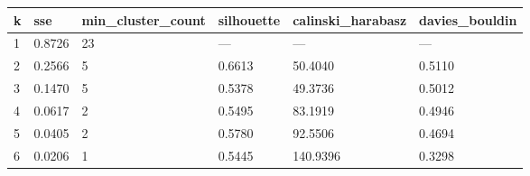 \begin{tabular}{llllll}
\hline
k & sse & min\_cluster\_count & silhouette & calinski\_harabasz & davies\_bouldin \\
\hline
1 & 0.8726 & 23 & — & — & — \\
2 & 0.2566 & 5 & 0.6613 & 50.4040 & 0.5110 \\
3 & 0.1470 & 5 & 0.5378 & 49.3736 & 0.5012 \\
4 & 0.0617 & 2 & 0.5495 & 83.1919 & 0.4946 \\
5 & 0.0405 & 2 & 0.5780 & 92.5506 & 0.4694 \\
6 & 0.0206 & 1 & 0.5445 & 140.9396 & 0.3298 \\
\hline
\end{tabular}